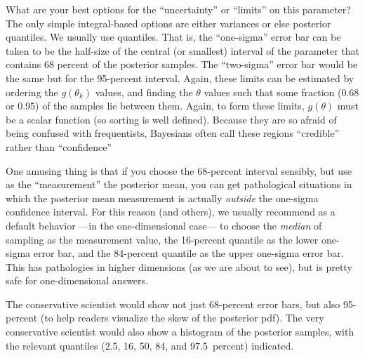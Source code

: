 \documentclass[modern]{aastex61}
\newcommand{\pars}{\theta}
\begin{document}
What are your best options for the ``uncertainty'' or ``limits'' on this parameter?
The only simple integral-based options are either variances or else posterior quantiles.
We usually use quantiles.
That is, the ``one-sigma'' error bar can be taken to be the half-size of the central (or smallest)
  interval of the parameter that contains 68 percent of the posterior
  samples.
The ``two-sigma'' error bar would be the same but for the 95-percent interval.
Again, these limits can be estimated%
  by ordering the $g(\pars_k)$ values,
  and finding the $\pars$ values such that some fraction (0.68 or 0.95)
  of the samples lie between them.
Again, to form these limits, $g(\pars)$ must be a scalar function (so sorting is well defined).
Because they are so afraid of being confused with frequentists,
Bayesians often call these regions ``credible'' rather than
``confidence''

One amusing thing is that if you choose the 68-percent interval sensibly,
  but use as the ``measurement'' the posterior mean,
  you can get pathological situations in which the posterior mean measurement
  is actually \emph{outside} the one-sigma confidence interval.
For this reason (and others), we usually recommend as a default behavior%
  ---in the one-dimensional case---%
  to choose the \emph{median} of sampling as the measurement value,
  the 16-percent quantile as the lower one-sigma error bar,
  and the 84-percent quantile as the upper one-sigma error bar.
This has pathologies in higher dimensions (as we are about to see),
  but is pretty safe for one-dimensional answers.

The conservative scientist would show not just 68-percent error bars,
  but also 95-percent
  (to help readers visualize the skew of the posterior pdf).
The very conservative scientist would also show a histogram
  of the posterior samples,
  with the relevant quantiles (2.5, 16, 50, 84, and 97.5~percent) indicated.
\end{document}
